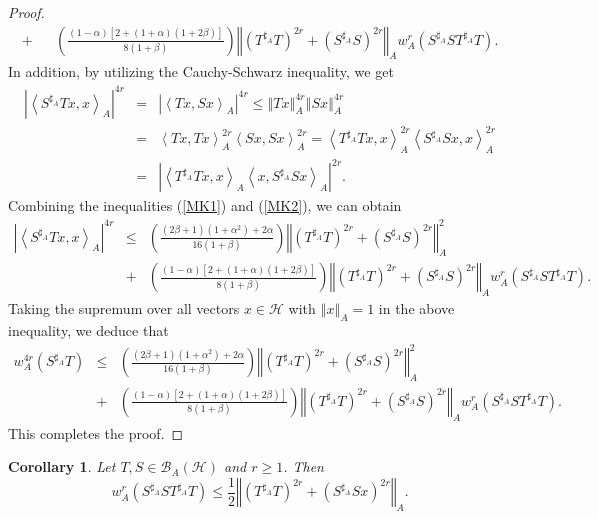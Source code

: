 \documentclass{article}
\newcommand{\bra}[1]{\left(#1\right)}
\newcommand{\sbra}[1]{\left[#1\right]}
\newcommand{\seqA}[1]{{\left<#1\right>}_{A}}
\newcommand{\normA}[1]{{\left\Vert#1\right\Vert}_{A}}
\newcommand{\abs}[1]{\left\vert#1\right\vert}
\newcommand {\Sa}{S^{\sharp_{A}}}
\newcommand {\h}{\mathcal{H}}
\newcommand {\Ta}{T^{\sharp_{A}}}
\renewcommand {\b}{\mathcal{B}}
\newtheorem{corollary}[theorem]{Corollary}
\begin{document}
\begin{proof}
\begin{eqnarray}
   +&&\bra{\frac{\bra{1-\alpha}\sbra{2+(1+\alpha)(1+2\beta)}}{8(1+\beta)}}\normA{\bra{\Ta T}^{2r}+\bra{\Sa S}^{2r}}w_A^{r}(\Sa S\Ta T).
\end{eqnarray}
In addition, by utilizing the Cauchy-Schwarz inequality, we get
\begin{eqnarray}\label{MK2}
  \abs{\seqA{\Sa Tx,x}}^{4r} &=& \abs{\seqA{Tx,Sx}}^{4r}\leq \normA{Tx}^{4r}\normA{Sx}^{4r}\nonumber \\
   &=& \seqA{Tx,Tx}^{2r}\seqA{Sx,Sx}^{2r}=\seqA{\Ta Tx,x}^{2r}\seqA{\Sa Sx,x}^{2r}\nonumber\\
   &=&\abs{\seqA{\Ta Tx,x}\seqA{x,\Sa Sx}}^{2r}.
\end{eqnarray}
Combining  the inequalities (\ref{MK1}) and (\ref{MK2}), we can obtain
\begin{eqnarray*}
  \abs{\seqA{\Sa Tx,x}}^{4r} &\leq& \bra{\frac{(2\beta+1)(1+\alpha^2)+2\alpha}{16(1+\beta)}}\normA{\bra{\Ta T}^{2r}+\bra{\Sa S}^{2r}}^2\nonumber\\
   &+& \bra{\frac{\bra{1-\alpha}\sbra{2+(1+\alpha)(1+2\beta)}}{8(1+\beta)}}\normA{\bra{\Ta T}^{2r}+\bra{\Sa S}^{2r}}w_A^{r}(\Sa S\Ta T).
\end{eqnarray*}
Taking the supremum over all vectors $x\in\h$ with $\normA{x}=1$ in the above inequality, we deduce that
\begin{eqnarray*}
  w_A^{4r} (\Sa T)&\leq& \bra{\frac{(2\beta+1)(1+\alpha^2)+2\alpha}{16(1+\beta)}}\normA{\bra{\Ta T}^{2r}+\bra{\Sa S}^{2r}}^2\nonumber\\
   &+& \bra{\frac{\bra{1-\alpha}\sbra{2+(1+\alpha)(1+2\beta)}}{8(1+\beta)}}\normA{\bra{\Ta T}^{2r}+\bra{\Sa S}^{2r}}w_A^{r}(\Sa S\Ta T).
\end{eqnarray*}
This completes the proof.
\end{proof}
\begin{corollary}\label{Cor-AQ} Let $T,S\in\b_A(\h)$ and $r\geq 1$. Then
\begin{equation}\label{product-A1}
  w_A^{r}(\Sa S\Ta T)\leq \frac{1}{2}\normA{\bra{\Ta T}^{2r}+\bra{\Sa Sx}^{2r}}.
\end{equation}
\end{corollary}
\end{document}
